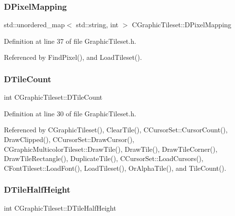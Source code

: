 \subsubsection{\texorpdfstring{D\+Pixel\+Mapping}{DPixelMapping}}
{\footnotesize\ttfamily std\+::unordered\+\_\+map$<$ std\+::string, int $>$ C\+Graphic\+Tileset\+::\+D\+Pixel\+Mapping\hspace{0.3cm}{\ttfamily [protected]}}



Definition at line 37 of file Graphic\+Tileset.\+h.



Referenced by Find\+Pixel(), and Load\+Tileset().

\hypertarget{classCGraphicTileset_a39d942b370e47f441bf97385eb1037c8}{}\label{classCGraphicTileset_a39d942b370e47f441bf97385eb1037c8} 
\subsubsection{\texorpdfstring{D\+Tile\+Count}{DTileCount}}
{\footnotesize\ttfamily int C\+Graphic\+Tileset\+::\+D\+Tile\+Count\hspace{0.3cm}{\ttfamily [protected]}}



Definition at line 30 of file Graphic\+Tileset.\+h.



Referenced by C\+Graphic\+Tileset(), Clear\+Tile(), C\+Cursor\+Set\+::\+Cursor\+Count(), Draw\+Clipped(), C\+Cursor\+Set\+::\+Draw\+Cursor(), C\+Graphic\+Multicolor\+Tileset\+::\+Draw\+Tile(), Draw\+Tile(), Draw\+Tile\+Corner(), Draw\+Tile\+Rectangle(), Duplicate\+Tile(), C\+Cursor\+Set\+::\+Load\+Cursors(), C\+Font\+Tileset\+::\+Load\+Font(), Load\+Tileset(), Or\+Alpha\+Tile(), and Tile\+Count().

\hypertarget{classCGraphicTileset_a16c8bc4e4c8738fe561b0408cd40ccef}{}\label{classCGraphicTileset_a16c8bc4e4c8738fe561b0408cd40ccef} 
\subsubsection{\texorpdfstring{D\+Tile\+Half\+Height}{DTileHalfHeight}}
{\footnotesize\ttfamily int C\+Graphic\+Tileset\+::\+D\+Tile\+Half\+Height\hspace{0.3cm}{\ttfamily [protected]}}



